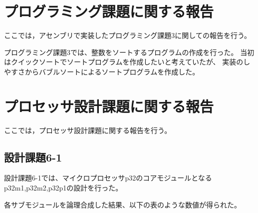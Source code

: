 \documentclass{jarticle}[11pt]
\begin{document}
\newpage


\section{プログラミング課題に関する報告}
\label{sec:プログラミング課題に関する報告}

ここでは，アセンブリで実装したプログラミング課題3に関しての報告を行う。

プログラミング課題3では、整数をソートするプログラムの作成を行った。
当初はクイックソートでソートプログラムを作成したいと考えていたが、
実装のしやすさからバブルソートによるソートプログラムを作成した。



\section{プロセッサ設計課題に関する報告}
\label{sec:プロセッサ設計課題に関する報告}

ここでは，プロセッサ設計課題に関する報告を行う。

\subsection{設計課題6-1}

設計課題6-1では、マイクロプロセッサp32のコアモジュールとなるp32m1,p32m2,p32p1の設計を行った。

各サブモジュールを論理合成した結果、以下の表のような数値が得られた。
\end{document}
